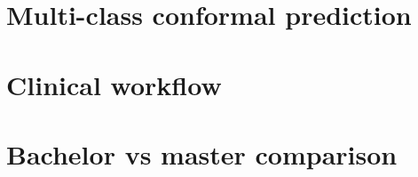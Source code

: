 \section{Multi-class conformal prediction}


\section{Clinical workflow}

\section{Bachelor vs master comparison}


